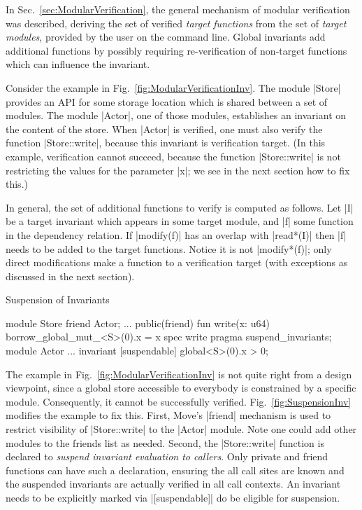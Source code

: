 In Sec.~\ref{sec:ModularVerification}, the general mechanism of modular
verification was described, deriving the set of verified \emph{target
  functions} from the set of \emph{target modules}, provided by the user on the
command line. Global invariants add additional functions by possibly requiring
re-verification of non-target functions which can influence the invariant.

Consider the example in Fig.~\ref{fig:ModularVerificationInv}. The module
|Store| provides an API for some storage location which is shared between a set
of modules. The module |Actor|, one of those modules, establishes an
invariant on the content of the store. When |Actor| is verified, one must
also verify the function |Store::write|, because this invariant is verification
target.  (In this example, verification cannot succeed, because the function
|Store::write| is not restricting the values for the parameter |x|; we see in
the next section how to fix this.)

In general, the set of additional functions to verify is computed as
follows. Let |I| be a target invariant which appears in some target module, and
|f| some function in the dependency relation. If |modify(f)| has an overlap
with |read*(I)| then |f| needs to be added to the target functions. Notice it is
not |modify*(f)|; only direct modifications make a function to a verification
target (with exceptions as discussed in the next section).



\begin{Figure}
  \caption{Suspension of Invariants}
  \label{fig:SuspensionInv}
  \centering
\begin{MoveBox}
  module Store {
    friend Actor;
    ...
    public(friend) fun write(x: u64) {
      borrow_global_mut_<S>(0).x = x
    }
    spec write { pragma suspend_invariants; }
  }
  module Actor {
    ...
    invariant [suspendable] global<S>(0).x > 0;
  }
\end{MoveBox}
\end{Figure}

The example in Fig.~\ref{fig:ModularVerificationInv} is not quite right from a
design viewpoint, since a global store accessible to everybody is constrained by
a specific module. Consequently, it cannot be successfully
verified. Fig.~\ref{fig:SuspensionInv} modifies the example to fix this. First,
Move's |friend| mechanism is used to restrict visibility of |Store::write| to
the |Actor| module. Note one could add other modules to the friends list as
needed.  Second, the |Store::write| function is declared to \emph{suspend
  invariant evaluation to callers}. Only private and friend functions can have
such a declaration, ensuring the all call sites are known and the suspended
invariants are actually verified in all call contexts.  An invariant needs to be
explicitly marked via |[suspendable]| do be eligible for suspension.

